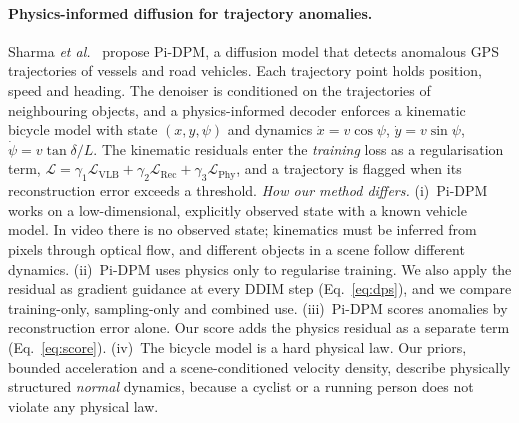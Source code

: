 \documentclass[11pt,a4paper]{article}
\begin{document}
\paragraph{Physics-informed diffusion for trajectory anomalies.}
Sharma \emph{et al.}~\cite{sharma2025pidpm} propose Pi-DPM, a diffusion model that detects anomalous GPS trajectories of vessels and road vehicles. Each trajectory point holds position, speed and heading. The denoiser is conditioned on the trajectories of neighbouring objects, and a physics-informed decoder enforces a kinematic bicycle model with state $(x,y,\psi)$ and dynamics $\dot{x}=v\cos\psi$, $\dot{y}=v\sin\psi$, $\dot{\psi}=v\tan\delta/L$. The kinematic residuals enter the \emph{training} loss as a regularisation term, $\mathcal{L}=\gamma_1\mathcal{L}_{\text{VLB}}+\gamma_2\mathcal{L}_{\text{Rec}}+\gamma_3\mathcal{L}_{\text{Phy}}$, and a trajectory is flagged when its reconstruction error exceeds a threshold.
\emph{How our method differs.}
(i)~Pi-DPM works on a low-dimensional, explicitly observed state with a known vehicle model. In video there is no observed state; kinematics must be inferred from pixels through optical flow, and different objects in a scene follow different dynamics.
(ii)~Pi-DPM uses physics only to regularise training. We also apply the residual as gradient guidance at every DDIM step (Eq.~\ref{eq:dps}), and we compare training-only, sampling-only and combined use.
(iii)~Pi-DPM scores anomalies by reconstruction error alone. Our score adds the physics residual as a separate term (Eq.~\ref{eq:score}).
(iv)~The bicycle model is a hard physical law. Our priors, bounded acceleration and a scene-conditioned velocity density, describe physically structured \emph{normal} dynamics, because a cyclist or a running person does not violate any physical law.
\end{document}
